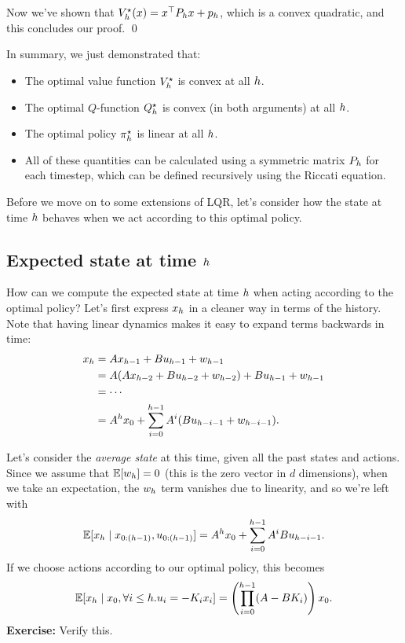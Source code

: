 \documentclass[\main/main]{subfiles}
\begin{document}
Now we've shown that $V^\star_h(x) = x^\top P_h x + p_h$, which is a convex quadratic, and this concludes our proof. \qed

In summary, we just demonstrated that:

\begin{itemize}
    \item The optimal value function $V^\star_h$ is convex at all $h$.
    \item The optimal $Q$-function $Q^\star_h$ is convex (in both arguments) at all $h$.
    \item The optimal policy $\pi^\star_h$ is linear at all $h$.
    \item All of these quantities can be calculated using a symmetric matrix $P_h$ for each timestep, which can be defined recursively using the Riccati equation.
\end{itemize}

Before we move on to some extensions of LQR, let's consider how the state at time $h$ behaves when we act according to this optimal policy.

\subsection{Expected state at time $h$}

How can we compute the expected state at time $h$ when acting according to the optimal policy?
Let's first express $x_h$ in a cleaner way in terms of the history. Note that having linear dynamics makes it easy to expand terms backwards in time:
\begin{align*}
    x_h &= A x_{h-1} + B u_{h-1} + w_{h-1} \\
    &= A (Ax_{h-2} + B u_{h-2} + w_{h-2}) + B u_{h-1} + w_{h-1} \\
    &= \cdots \\
    &= A^h x_0 + \sum_{i=0}^{h-1} A^i (B u_{h-i-1} + w_{h-i-1}).
\end{align*}

Let's consider the \emph{average state} at this time, given all the past states and actions.
Since we assume that $\operatorname*{\mathbb{E}} [w_h] = 0$ (this is the zero vector in $d$ dimensions),
when we take an expectation, the $w_h$ term vanishes due to linearity, and so we're left with \[
    \operatorname*{\mathbb{E}} [x_h \mid x_{0:(h-1)}, u_{0:(h-1)}] = A^h x_0 + \sum_{i=0}^{h-1} A^i B u_{h-i-1}.
\]
If we choose actions according to our optimal policy, this becomes \[
    \operatorname*{\mathbb{E}} [x_h \mid x_0, \forall i \le h . u_i = - K_i x_i] = \left( \prod_{i=0}^{h-1} (A - B K_i) \right) x_0.
\]
\textbf{Exercise:} Verify this.
\end{document}
